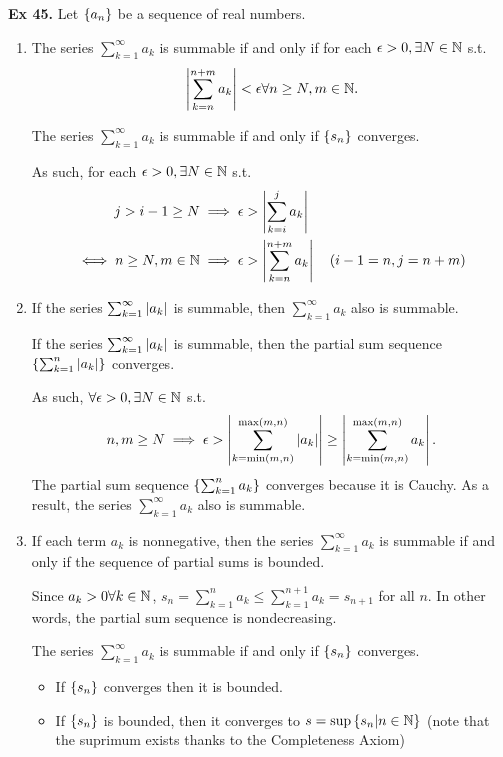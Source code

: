 \noindent \textbf{Ex 45.} \label{ex:45}
Let $\left\{a_n\right\}$ be a sequence of real numbers.
\begin{enumerate}[label=(\roman*)]
    \item The series $\sum_{k=1}^\infty a_k$ is summable if and only if for each $\epsilon > 0, \exists N\in\mathbb{N}$ s.t.
    \[ \left|\sum_{k=n}^{n+m} a_k\right| < \epsilon \forall n \geq N, m \in \mathbb{N}.\]
    
    The series $\sum_{k=1}^{\infty} a_k$ is summable if and only if $\left\{s_n\right\}$ converges.

    As such, for each $\epsilon > 0, \exists N \in \mathbb{N}$ s.t.
    \begin{align*}
        j > i-1 \geq N &\implies \epsilon > \left|\sum_{k=i}^{j} a_k\right| \\
        \iff n \geq N, m \in \mathbb{N} &\implies \epsilon > \left|\sum_{k=n}^{n+m} a_k\right| \quad (i-1 = n, j = n+m)
    \end{align*}
    
    \item If the series $\sum_{k=1}^\infty \left|a_k\right|$ is summable, then $\sum_{k=1}^\infty a_k$ also is summable.

    If the series $\sum_{k=1}^\infty \left|a_k\right|$ is summable, then the partial sum sequence $\left\{\sum_{k=1}^{n} \left|a_k\right|\right\}$ converges.
    
    As such, $\forall \epsilon > 0, \exists N \in\mathbb{N}$ s.t.
    \[ n,m \geq N \implies \epsilon > \left|\sum_{k=\min(m,n)}^{\max(m,n)} \left|a_k\right|\right| \geq \left|\sum_{k=\min(m,n)}^{\max(m,n)} a_k\right|. \]
    The partial sum sequence $\left\{\sum_{k=1}^{n} a_k\right\}$ converges because it is Cauchy. As a result, the series $\sum_{k=1}^\infty a_k$ also is summable.

    \item If each term $a_k$ is nonnegative, then the series $\sum_{k=1}^\infty a_k$ is summable if and only if the sequence of partial sums is bounded.
    
    Since $a_k > 0 \forall k\in\mathbb{N}$, $s_n = \sum_{k=1}^{n} a_k \leq \sum_{k=1}^{n+1} a_k = s_{n+1}$ for all $n$. In other words, the partial sum sequence is nondecreasing.

    The series $\sum_{k=1}^{\infty} a_k$ is summable if and only if $\left\{s_n\right\}$ converges.
    \begin{itemize}
        \item If $\left\{s_n\right\}$ converges then it is bounded.
        \item If $\left\{s_n\right\}$ is bounded, then it converges to $s = \sup\left\{s_n | n \in \mathbb{N}\right\}$ (note that the suprimum exists thanks to the Completeness Axiom)
        

\end{itemize}
\end{enumerate}
